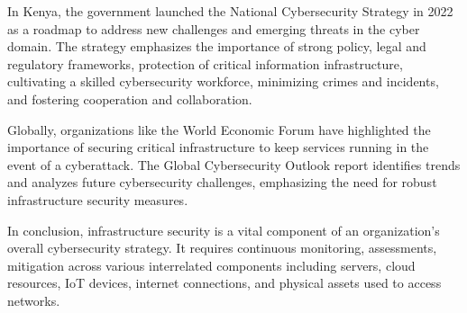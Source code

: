 \documentclass{article}
\begin{document}
In Kenya, the government launched the National Cybersecurity Strategy in 2022 as a roadmap to address new challenges and emerging threats in the cyber domain\cite{national-computer-and-cybercrimes-coordination-committee-no-date}. The strategy emphasizes the importance of strong policy, legal and regulatory frameworks, protection of critical information infrastructure, cultivating a skilled cybersecurity workforce, minimizing crimes and incidents, and fostering cooperation and collaboration\cite{national-computer-and-cybercrimes-coordination-committee-no-date}.

Globally, organizations like the World Economic Forum have highlighted the importance of securing critical infrastructure to keep services running in the event of a cyberattack\cite{world-economic-forum-securing-critical-infrastructure-2023}. The Global Cybersecurity Outlook report identifies trends and analyzes future cybersecurity challenges, emphasizing the need for robust infrastructure security measures\cite{world-economic-forum-global-cybersecurity-outlook-2023}.

In conclusion, infrastructure security is a vital component of an organization’s overall cybersecurity strategy. It requires continuous monitoring, assessments, mitigation across various interrelated components including servers, cloud resources, IoT devices, internet connections, and physical assets used to access networks\cite{securing-networks-cybersecurity-and-infrastructure-security-agency-cisa-no-date}.
\end{document}
